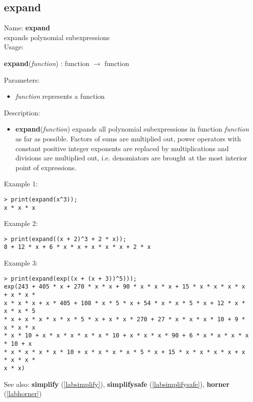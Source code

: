 \subsection{expand}
\label{labexpand}
\noindent Name: \textbf{expand}\\
expands polynomial subexpressions\\
\noindent Usage: 
\begin{center}
\textbf{expand}(\emph{function}) : \textsf{function} $\rightarrow$ \textsf{function}
\\ 
\end{center}
Parameters: 
\begin{itemize}
\item \emph{function} represents a function
\end{itemize}
\noindent Description: \begin{itemize}

\item \textbf{expand}(\emph{function}) expands all polynomial subexpressions in function
   \emph{function} as far as possible. Factors of sums are multiplied out,
   power operators with constant positive integer exponents are replaced
   by multiplications and divisions are multiplied out, i.e. denomiators
   are brought at the most interior point of expressions.
\end{itemize}
\noindent Example 1: 
\begin{center}\begin{minipage}{15cm}\begin{Verbatim}[frame=single]
> print(expand(x^3));
x * x * x
\end{Verbatim}
\end{minipage}\end{center}
\noindent Example 2: 
\begin{center}\begin{minipage}{15cm}\begin{Verbatim}[frame=single]
> print(expand((x + 2)^3 + 2 * x));
8 + 12 * x + 6 * x * x + x * x * x + 2 * x
\end{Verbatim}
\end{minipage}\end{center}
\noindent Example 3: 
\begin{center}\begin{minipage}{15cm}\begin{Verbatim}[frame=single]
> print(expand(exp((x + (x + 3))^5)));
exp(243 + 405 * x + 270 * x * x + 90 * x * x * x + 15 * x * x * x * x + x * x * 
x * x * x + x * 405 + 108 * x * 5 * x + 54 * x * x * 5 * x + 12 * x * x * x * 5 
* x + x * x * x * x * 5 * x + x * x * 270 + 27 * x * x * x * 10 + 9 * x * x * x 
* x * 10 + x * x * x * x * x * 10 + x * x * x * 90 + 6 * x * x * x * x * 10 + x 
* x * x * x * x * 10 + x * x * x * x * 5 * x + 15 * x * x * x * x + x * x * x * 
x * x)
\end{Verbatim}
\end{minipage}\end{center}
See also: \textbf{simplify} (\ref{labsimplify}), \textbf{simplifysafe} (\ref{labsimplifysafe}), \textbf{horner} (\ref{labhorner})
